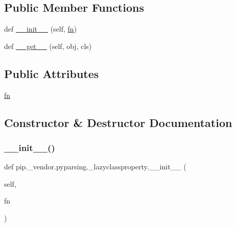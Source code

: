 \subsection*{Public Member Functions}
\begin{DoxyCompactItemize}
\item 
def \hyperlink{classpip_1_1__vendor_1_1pyparsing_1_1__lazyclassproperty_aaa332f4d5426b492dbda0b2a4b17d78e}{\+\_\+\+\_\+init\+\_\+\+\_\+} (self, \hyperlink{classpip_1_1__vendor_1_1pyparsing_1_1__lazyclassproperty_a3810a0dddf85f47650203a368d65416c}{fn})
\item 
def \hyperlink{classpip_1_1__vendor_1_1pyparsing_1_1__lazyclassproperty_a8ad75055d601bf497153f5dced0664a4}{\+\_\+\+\_\+get\+\_\+\+\_\+} (self, obj, cls)
\end{DoxyCompactItemize}
\subsection*{Public Attributes}
\begin{DoxyCompactItemize}
\item 
\hyperlink{classpip_1_1__vendor_1_1pyparsing_1_1__lazyclassproperty_a3810a0dddf85f47650203a368d65416c}{fn}
\end{DoxyCompactItemize}


\subsection{Constructor \& Destructor Documentation}
\mbox{\label{classpip_1_1__vendor_1_1pyparsing_1_1__lazyclassproperty_aaa332f4d5426b492dbda0b2a4b17d78e}} 
\subsubsection{\texorpdfstring{\+\_\+\+\_\+init\+\_\+\+\_\+()}{\_\_init\_\_()}}
{\footnotesize\ttfamily def pip.\+\_\+vendor.\+pyparsing.\+\_\+lazyclassproperty.\+\_\+\+\_\+init\+\_\+\+\_\+ (\begin{DoxyParamCaption}\item[{}]{self,  }\item[{}]{fn }\end{DoxyParamCaption})}



